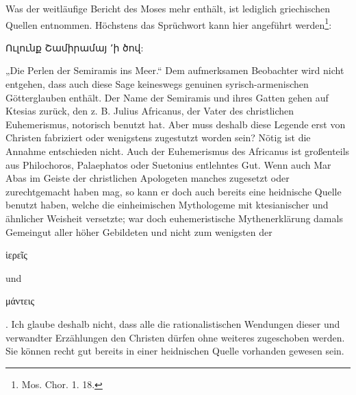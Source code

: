 \documentclass{article}
\begin{document}
Was der weitläufige Bericht des Moses mehr enthält, ist lediglich griechischen Quellen entnommen. Höchstens das Sprüchwort kann hier angeführt werden\footnote{Mos. Chor. 1. 18.}: \begin{armenian}Ուլունք Շամիրամայ ՚ի ծով:\end{armenian} „Die Perlen der Semiramis ins Meer.“ Dem aufmerksamen Beobachter wird nicht entgehen, dass auch diese Sage keineswegs genuinen syrisch-armenischen Götterglauben enthält. Der Name der Semiramis und ihres Gatten gehen auf Ktesias zurück, den z. B. Julius Africanus, der Vater des christlichen Euhemerismus, notorisch benutzt hat. Aber muss deshalb diese Legende erst von Christen fabriziert oder wenigstens zugestutzt worden sein? Nötig ist die Annahme entschieden nicht. Auch der Euhemerismus des Africanus ist großenteils aus Philochoros, Palaephatos oder Suetonius entlehntes Gut. Wenn auch Mar Abas im Geiste der christlichen Apologeten manches zugesetzt oder zurechtgemacht haben mag, so kann er doch auch bereits eine heidnische Quelle benutzt haben, welche die einheimischen Mythologeme mit ktesianischer und ähnlicher Weisheit versetzte; war doch euhemeristische Mythenerklärung damals Gemeingut aller höher Gebildeten und nicht zum wenigsten der \begin{greek}ἱερεῖς\end{greek} und \begin{greek}μάντεις\end{greek}. Ich glaube deshalb nicht, dass alle die rationalistischen Wendungen dieser und verwandter Erzählungen den Christen dürfen ohne weiteres zugeschoben werden. Sie können recht gut bereits in einer heidnischen Quelle vorhanden gewesen sein.
\end{document}
